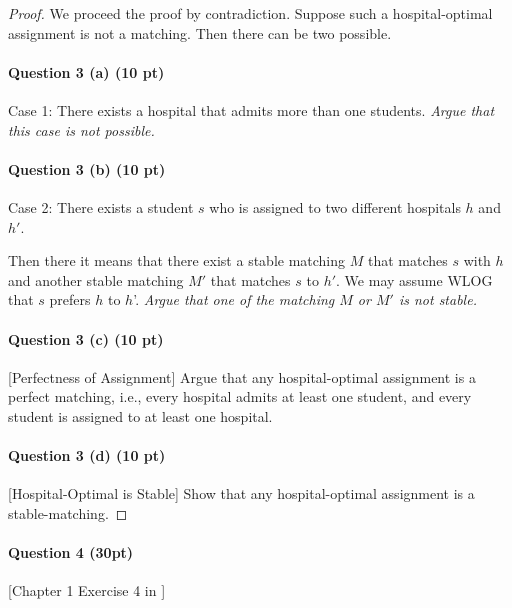 \documentclass[11pt,letterpaper]{article}
\begin{document}
\begin{proof}

We proceed the proof by contradiction.
Suppose such a hospital-optimal assignment is not a matching.
Then there can be two possible. 

\medskip

\paragraph*{Question 3 (a) (10 pt)} Case 1: There exists a hospital that admits more than one students.
{\em Argue that this case is not possible.}

\medskip

\paragraph*{Question 3 (b) (10 pt)} Case 2: There exists a student $s$ who is assigned to two different hospitals $h$ and $h'$. 

Then there it means that there exist a stable matching $M$ that matches $s$ with $h$ and another stable matching $M'$ that matches $s$ to $h'$.  We may assume WLOG that $s$ prefers $h$ to $h$'. {\em Argue that one of the matching $M$ or $M'$ is not stable.}

\medskip

\paragraph*{Question 3 (c) (10 pt)} [Perfectness of Assignment] Argue that any hospital-optimal assignment is a perfect matching, i.e., every hospital admits at least one student, and every student is assigned to at least one hospital. 

\medskip


\paragraph*{Question 3 (d) (10 pt)} [Hospital-Optimal is Stable] Show that any hospital-optimal assignment is a stable-matching.

\medskip

\end{proof}


\pagebreak

\paragraph*{Question 4 (30pt)} [Chapter 1 Exercise 4 in \cite{KT05}]
\end{document}
